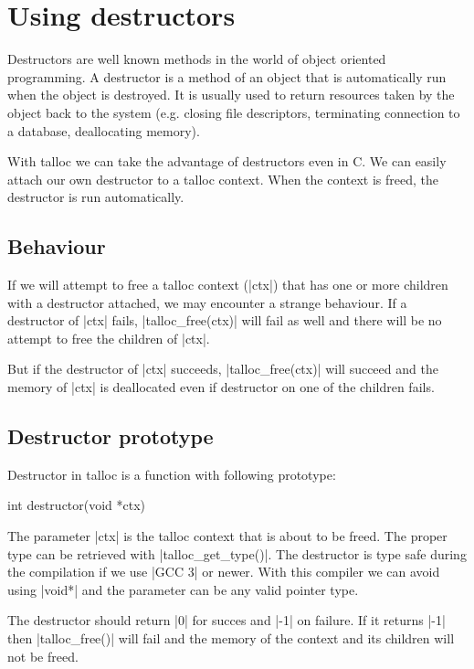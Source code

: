 \section{Using destructors}
\label{talloc:sec:destructors}

Destructors are well known methods in the world of object oriented programming.
A destructor is a method of an object that is automatically run when the object
is destroyed. It is usually used to return resources taken by the object back to
the system (e.g. closing file descriptors, terminating connection to a database,
deallocating memory).

With talloc we can take the advantage of destructors even in C. We can easily
attach our own destructor to a talloc context. When the context is freed, the
destructor is run automatically.

\subsection{Behaviour}

If we will attempt to free a talloc context (|ctx|) that has one or more
children with a destructor attached, we may encounter a strange behaviour. If a
destructor of |ctx| fails, |talloc_free(ctx)| will fail as well and there will
be no attempt to free the children of |ctx|.

But if the destructor of |ctx| succeeds, |talloc_free(ctx)| will succeed and
the memory of |ctx| is deallocated even if destructor on one of the children
fails.

\subsection{Destructor prototype}

Destructor in talloc is a function with following prototype:

\begin{funcproto}
int destructor(void *ctx)
\end{funcproto}
\funclistend
The parameter |ctx| is the talloc context that is about to be freed. The proper
type can be retrieved with |talloc_get_type()|. The destructor is type safe during
the compilation if we use |GCC 3| or newer. With this compiler we can avoid 
using |void*| and the parameter can be any valid pointer type.

The destructor should return |0| for succes and |-1| on failure. If it returns
|-1| then |talloc_free()| will fail and the memory of the context and its
children will not be freed.

